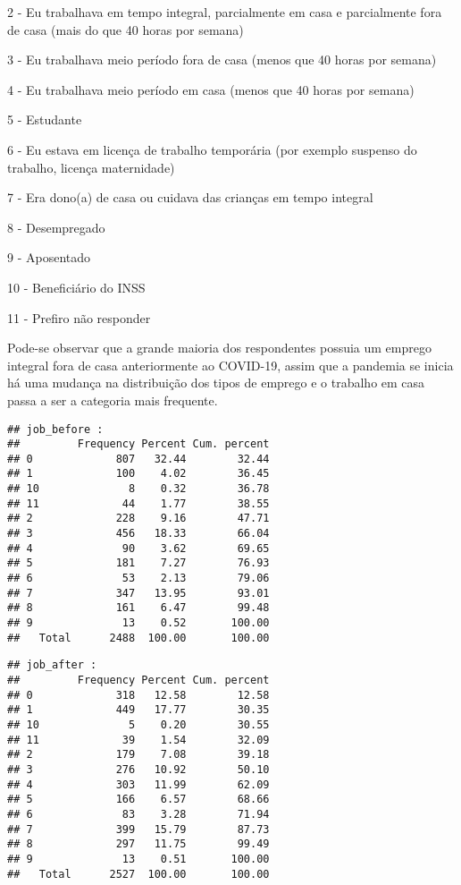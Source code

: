 \documentclass[
]{article}
\begin{document}
2 - Eu trabalhava em tempo integral, parcialmente em casa e parcialmente
fora de casa (mais do que 40 horas por semana)

3 - Eu trabalhava meio período fora de casa (menos que 40 horas por
semana)

4 - Eu trabalhava meio período em casa (menos que 40 horas por semana)

5 - Estudante

6 - Eu estava em licença de trabalho temporária (por exemplo suspenso do
trabalho, licença maternidade)

7 - Era dono(a) de casa ou cuidava das crianças em tempo integral

8 - Desempregado

9 - Aposentado

10 - Beneficiário do INSS

11 - Prefiro não responder

Pode-se observar que a grande maioria dos respondentes possuia um
emprego integral fora de casa anteriormente ao COVID-19, assim que a
pandemia se inicia há uma mudança na distribuição dos tipos de emprego e
o trabalho em casa passa a ser a categoria mais frequente.

\begin{verbatim}
## job_before : 
##         Frequency Percent Cum. percent
## 0             807   32.44        32.44
## 1             100    4.02        36.45
## 10              8    0.32        36.78
## 11             44    1.77        38.55
## 2             228    9.16        47.71
## 3             456   18.33        66.04
## 4              90    3.62        69.65
## 5             181    7.27        76.93
## 6              53    2.13        79.06
## 7             347   13.95        93.01
## 8             161    6.47        99.48
## 9              13    0.52       100.00
##   Total      2488  100.00       100.00
\end{verbatim}

\begin{verbatim}
## job_after : 
##         Frequency Percent Cum. percent
## 0             318   12.58        12.58
## 1             449   17.77        30.35
## 10              5    0.20        30.55
## 11             39    1.54        32.09
## 2             179    7.08        39.18
## 3             276   10.92        50.10
## 4             303   11.99        62.09
## 5             166    6.57        68.66
## 6              83    3.28        71.94
## 7             399   15.79        87.73
## 8             297   11.75        99.49
## 9              13    0.51       100.00
##   Total      2527  100.00       100.00
\end{verbatim}
\end{document}
